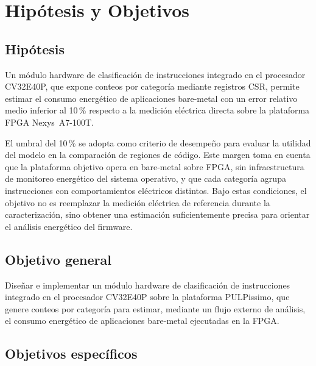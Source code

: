 \chapter{Hipótesis y Objetivos}
\label{ch:obj}

\section{Hipótesis}
\label{sec:hipotesis}

Un módulo hardware de clasificación de instrucciones integrado en el procesador
CV32E40P, que expone conteos por categoría mediante registros CSR, permite
estimar el consumo energético de aplicaciones bare-metal con un error relativo
medio inferior al 10\,\% respecto a la medición eléctrica directa sobre la
plataforma FPGA Nexys~A7-100T.

El umbral del 10\,\% se adopta como criterio de desempeño para evaluar la
utilidad del modelo en la comparación de regiones de código. Este margen toma
en cuenta que la plataforma objetivo opera en bare-metal sobre FPGA, sin
infraestructura de monitoreo energético del sistema operativo, y que cada
categoría agrupa instrucciones con comportamientos eléctricos distintos. Bajo
estas condiciones, el objetivo no es reemplazar la medición eléctrica de
referencia durante la caracterización, sino obtener una estimación suficientemente
precisa para orientar el análisis energético del firmware.

\section{Objetivo general}
\label{sec:obj_general}

Diseñar e implementar un módulo hardware de clasificación de instrucciones
integrado en el procesador CV32E40P sobre la plataforma PULPissimo, que genere
conteos por categoría para estimar, mediante un flujo externo de análisis, el
consumo energético de aplicaciones bare-metal ejecutadas en la FPGA.

\section{Objetivos específicos}
\label{sec:obj_especificos}

